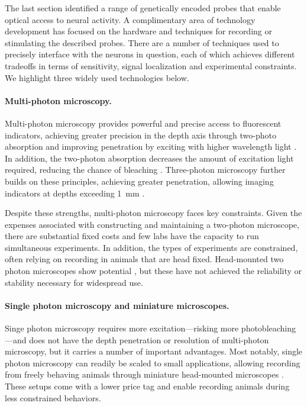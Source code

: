 The last section identified 
a range of genetically encoded probes that enable optical 
access to neural activity. A complimentary area of 
technology development has focused on the hardware and 
techniques for recording or stimulating the described 
probes. There are a number of techniques used to precisely 
interface with the neurons in question, each of which 
achieves different tradeoffs in terms of sensitivity, 
signal localization and experimental constraints. We 
highlight three widely used technologies below.

\paragraph{Multi-photon microscopy.} Multi-photon microscopy
provides powerful and precise access to fluorescent indicators,
achieving greater precision in the depth axis through  
two-photo absorption and improving penetration by exciting  
with higher wavelength light \cite{Xu:1996ul}. In addition,
the two-photon absorption decreases the amount of excitation light 
required, reducing the chance of bleaching \cite{Denk:1990ws}.
Three-photon microscopy further builds on these principles, 
achieving greater penetration, allowing imaging indicators 
at depths exceeding 1~mm \cite{Horton:2013gxa,Wang:2017jp}.

Despite these strengths, multi-photon microscopy faces key 
constraints. Given the expenses associated with constructing and 
maintaining a two-photon microscope, there are substantial fixed 
costs and few labs have the capacity to run simultaneous 
experiments. In addition, the types of experiments are constrained,
often relying on recording in animals that are head fixed. 
Head-mounted two photon microscopes show 
potential \cite{Helmchen:2001tw,Flusberg:2005tq}, but these 
have not achieved the reliability or stability necessary for 
widespread use.

\paragraph{Single photon microscopy and miniature microscopes.}
Singe photon microscopy requires more excitation---risking more
photobleaching---and does not have the depth penetration or 
resolution of multi-photon microscopy, but it carries a number 
of important advantages. Most notably, single photon microscopy 
can readily be scaled to small applications, allowing recording 
from freely behaving animals through miniature head-mounted 
microscopes \cite{Ghosh:2011ee,Cai:2016hm,LibertiIII:2017df}.
These setups come with a lower price tag and enable 
recording animals during less constrained behaviors.

